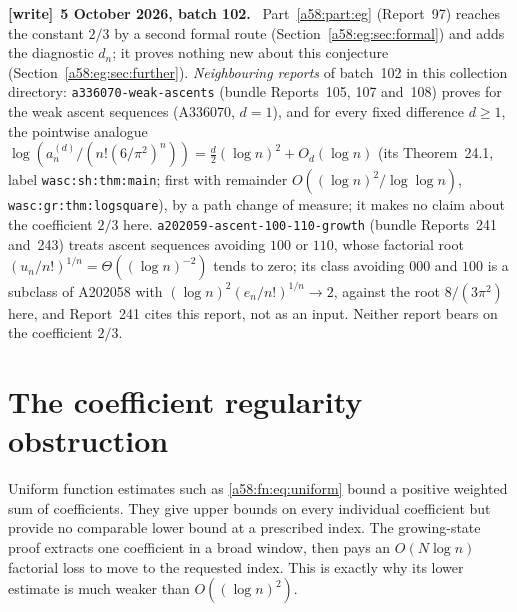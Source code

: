 \documentclass[11pt,letterpaper]{article}
\newcommand{\file}[1]{\nolinkurl{#1}}
\theoremstyle{remark}
\newenvironment{writenote}[1][]{\par\smallskip\begingroup\small
 \noindent\textbf{[write]}\if\relax\detokenize{#1}\relax\else~\textbf{#1.}\fi\ }%
 {\par\endgroup\smallskip}
\begin{document}
\begin{writenote}[5 October 2026, batch 102]
Part~\ref{a58:part:eg} (Report~97) reaches the constant $2/3$ by a second formal route (Section~\ref{a58:eg:sec:formal}) and adds the diagnostic $d_n$; it proves nothing new about this conjecture (Section~\ref{a58:eg:sec:further}). \emph{Neighbouring reports} of batch~102 in this collection directory: \file{a336070-weak-ascents} (bundle Reports~105, 107 and~108) proves for the weak ascent sequences (A336070, $d=1$), and for every fixed difference $d\ge1$, the pointwise analogue $\log(a^{(d)}_n/(n!(6/\pi^2)^n))=\frac d2(\log n)^2+O_d(\log n)$ (its Theorem~24.1, label \texttt{wasc:sh:thm:main}; first with remainder $O((\log n)^2/\log\log n)$, \texttt{wasc:gr:thm:logsquare}), by a path change of measure; it makes no claim about the coefficient $2/3$ here. \file{a202059-ascent-100-110-growth} (bundle Reports~241 and~243) treats ascent sequences avoiding $100$ or $110$, whose factorial root $(u_n/n!)^{1/n}=\Theta((\log n)^{-2})$ tends to zero; its class avoiding $000$ and $100$ is a subclass of A202058 with $(\log n)^2(e_n/n!)^{1/n}\to2$, against the root $8/(3\pi^2)$ here, and Report~241 cites this report, not as an input. Neither report bears on the coefficient $2/3$.
\end{writenote}

\section{The coefficient regularity obstruction}\label{a58:fn:sec:regularity}
Uniform function estimates such as \eqref{a58:fn:eq:uniform} bound a positive weighted sum of coefficients. They give upper bounds on every individual coefficient but provide no comparable lower bound at a prescribed index. The growing-state proof extracts one coefficient in a broad window, then pays an $O(N\log n)$ factorial loss to move to the requested index. This is exactly why its lower estimate is much weaker than $O((\log n)^2)$.
\end{document}
